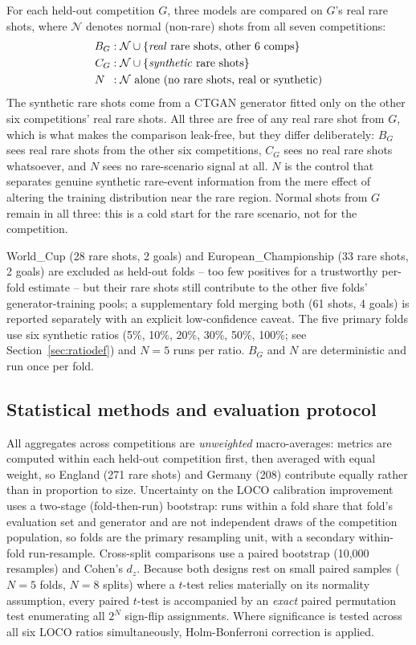 \documentclass[conference,a4paper]{IEEEtran}
\begin{document}
For each held-out competition $G$, three models are compared on $G$'s real rare shots, where $\mathcal{N}$ denotes normal (non-rare) shots from all seven competitions:
\[
\begin{aligned}
B_G &: \mathcal{N}\cup\{\text{\emph{real} rare shots, other 6 comps}\}\\
C_G &: \mathcal{N}\cup\{\text{\emph{synthetic} rare shots}\}\\
N\ \, &: \mathcal{N}\ \text{alone (no rare shots, real or synthetic)}
\end{aligned}
\]
The synthetic rare shots come from a CTGAN generator fitted only on the other six competitions' real rare shots. All three are free of any real rare shot from $G$, which is what makes the comparison leak-free, but they differ deliberately: $B_G$ sees real rare shots from the other six competitions, $C_G$ sees no real rare shots whatsoever, and $N$ sees no rare-scenario signal at all. $N$ is the control that separates genuine synthetic rare-event information from the mere effect of altering the training distribution near the rare region. Normal shots from $G$ remain in all three: this is a cold start for the rare scenario, not for the competition.

World\_Cup (28 rare shots, 2 goals) and European\_Championship (33 rare shots, 2 goals) are excluded as held-out folds -- too few positives for a trustworthy per-fold estimate -- but their rare shots still contribute to the other five folds' generator-training pools; a supplementary fold merging both (61 shots, 4 goals) is reported separately with an explicit low-confidence caveat. The five primary folds use six synthetic ratios (5\%, 10\%, 20\%, 30\%, 50\%, 100\%; see Section~\ref{sec:ratiodef}) and $N=5$ runs per ratio. $B_G$ and $N$ are deterministic and run once per fold.

\subsection{Statistical methods and evaluation protocol}
\label{sec:stats}
All aggregates across competitions are \emph{unweighted} macro-averages: metrics are computed within each held-out competition first, then averaged with equal weight, so England (271 rare shots) and Germany (208) contribute equally rather than in proportion to size. Uncertainty on the LOCO calibration improvement uses a two-stage (fold-then-run) bootstrap: runs within a fold share that fold's evaluation set and generator and are not independent draws of the competition population, so folds are the primary resampling unit, with a secondary within-fold run-resample. Cross-split comparisons use a paired bootstrap (10{,}000 resamples) and Cohen's $d_z$. Because both designs rest on small paired samples ($N=5$ folds, $N=8$ splits) where a $t$-test relies materially on its normality assumption, every paired $t$-test is accompanied by an \emph{exact} paired permutation test enumerating all $2^N$ sign-flip assignments. Where significance is tested across all six LOCO ratios simultaneously, Holm-Bonferroni correction is applied.
\end{document}
